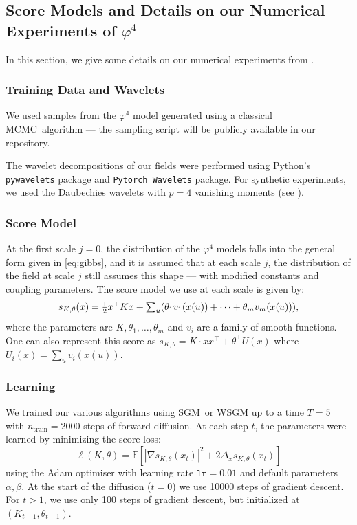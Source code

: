 \documentclass{article}
\begin{document}
\subsection{Score Models and Details on our Numerical Experiments of $\varphi^4$}\label{app:score_phi4}

In this section, we give some details on our numerical experiments from . 

\subsubsection*{Training Data and Wavelets}

We used samples from the $\varphi^4$ model generated using a classical MCMC algorithm --- the sampling script will be publicly available in our repository. 

The wavelet decompositions of our fields were performed using Python's \texttt{pywavelets} package and \texttt{Pytorch Wavelets} package. For synthetic experiments, we used the Daubechies wavelets with $p=4$ vanishing moments (see \cite[Section 7.2.3]{mallat1999wavelet}). 


\subsubsection*{Score Model}

At the first scale $j=0$, the distribution of the $\varphi^4$ models falls into the general form given in \eqref{eq:gibbs}, and it is assumed that at each scale $j$, the distribution of the field at scale $j$ still assumes this shape --- with modified constants and coupling parameters. The score model we use at each scale is given by:
\begin{equation}\label{eq:phi4score}
  \textstyle{
    {{s}}_{K,\theta}(x) = \frac{1}{2}x^\top K x + \sum_{u}(\theta_1v_1(x(u)) + \dotsb + \theta_m v_m(x(u))),
    }
\end{equation}
where the parameters are $K,\theta_1, \dotsc, \theta_m$ and $v_i$ are a family of smooth functions. One can also represent this score as $s_{K,\theta} = K \cdot xx^\top + \theta^\top U(x)$ where $U_i(x) = \sum_u v_i(x(u))$. 



\subsubsection*{Learning}

We trained our various algorithms using SGM or WSGM up to a time $T=5$ with $n_{\mathrm{train}} = 2000$ steps of forward diffusion. At each step $t$, the parameters were learned by minimizing the score loss:
$$ \ell(K,\theta) = \mathbb{E}[|\nabla s_{K,\theta}(x_t)|^2 + 2 \Delta_x s_{K,\theta}(x_t)]$$
using the Adam optimiser with learning rate $\texttt{lr} = 0.01$ and default parameters $\alpha, \beta$. At the start of the diffusion ($t=0$) we use 10000 steps of gradient descent. For $t>1$, we use only 100 steps of gradient descent, but initialized at $(K_{t-1}, \theta_{t-1})$.
\end{document}
